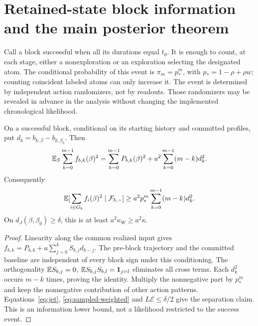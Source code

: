 \section{Retained-state block information and the main posterior theorem}
\label{sec:blocks}
Call a block successful when all its durations equal $t_0$. It is enough to
count, at each stage, either a nonexploration or an exploration selecting the
designated atom. The conditional probability of this event is
$\pi_m=p_*^m$, with $p_*=1-\rho+\rho w$; counting coincident labeled atoms
can only increase it. The event is determined by independent action randomizers,
not by readouts. Those randomizers may be revealed in advance in the analysis
without changing the implemented chronological likelihood.

\begin{lemma}
\label{lem:block-floor}
On a successful block, conditional on its starting history and committed
profiles, put $d_k=b_{k,\beta}-b_{k,\beta_0}$. Then
\begin{equation}
 \mathbb E_S\sum_{k=0}^{m-1}f_{b,k}(\beta)^2
 =\sum_{k=0}^{m-1}P_{b,k}(\beta)^2
  +a^2\sum_{k=0}^{m-1}(m-k)d_k^2.
 \label{eq:sign-energy}
\end{equation}
Consequently
\begin{equation}
 \mathbb E[\sum_{i\in G_b}f_i(\beta)^2\mid\mathcal F_{b,-}]
 \ge a^2p_*^m\sum_{k=0}^{m-1}(m-k)d_k^2.
 \label{eq:block-floor}
\end{equation}
On $d_J(\beta,\beta_0)\ge\delta$, this is at least $a^2\kappa_W\ge a^2\kappa$.
\end{lemma}
\begin{proof}
Linearity along the common realized input gives
$f_{b,k}=P_{b,k}+a\sum_{j=0}^k S_{b,j}d_{k-j}$.
The pre-block trajectory and the committed baseline are independent of every
block sign under this conditioning. The orthogonality
$\mathbb E S_{b,j}=0$, $\mathbb E S_{b,j}S_{b,l}=\mathbf1_{j=l}$ eliminates all cross terms.
Each $d_k^2$ occurs $m-k$ times, proving the identity. Multiply the nonnegative
part by $p_*^m$ and keep the nonnegative contribution of other action patterns.
Equations~\eqref{eq:jet}, \eqref{eq:sampled-weighted} and
$L\mathcal E\le\delta/2$ give the separation claim. This is an information
lower bound, not a likelihood restricted to the success event.
\end{proof}

